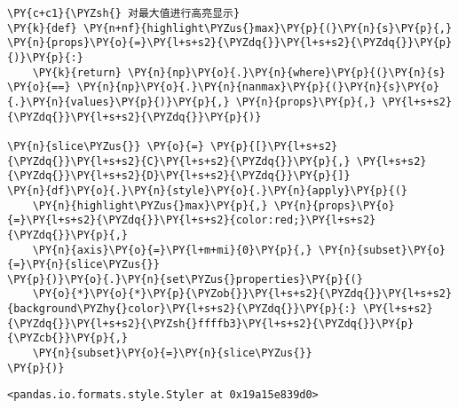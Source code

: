     \begin{tcolorbox}[breakable, size=fbox, boxrule=1pt, pad at break*=1mm,colback=cellbackground, colframe=cellborder]
\begin{Verbatim}[commandchars=\\\{\}]
\PY{c+c1}{\PYZsh{} 对最大值进行高亮显示}
\PY{k}{def} \PY{n+nf}{highlight\PYZus{}max}\PY{p}{(}\PY{n}{s}\PY{p}{,} \PY{n}{props}\PY{o}{=}\PY{l+s+s2}{\PYZdq{}}\PY{l+s+s2}{\PYZdq{}}\PY{p}{)}\PY{p}{:}
    \PY{k}{return} \PY{n}{np}\PY{o}{.}\PY{n}{where}\PY{p}{(}\PY{n}{s} \PY{o}{==} \PY{n}{np}\PY{o}{.}\PY{n}{nanmax}\PY{p}{(}\PY{n}{s}\PY{o}{.}\PY{n}{values}\PY{p}{)}\PY{p}{,} \PY{n}{props}\PY{p}{,} \PY{l+s+s2}{\PYZdq{}}\PY{l+s+s2}{\PYZdq{}}\PY{p}{)}

\PY{n}{slice\PYZus{}} \PY{o}{=} \PY{p}{[}\PY{l+s+s2}{\PYZdq{}}\PY{l+s+s2}{C}\PY{l+s+s2}{\PYZdq{}}\PY{p}{,} \PY{l+s+s2}{\PYZdq{}}\PY{l+s+s2}{D}\PY{l+s+s2}{\PYZdq{}}\PY{p}{]}
\PY{n}{df}\PY{o}{.}\PY{n}{style}\PY{o}{.}\PY{n}{apply}\PY{p}{(}
    \PY{n}{highlight\PYZus{}max}\PY{p}{,} \PY{n}{props}\PY{o}{=}\PY{l+s+s2}{\PYZdq{}}\PY{l+s+s2}{color:red;}\PY{l+s+s2}{\PYZdq{}}\PY{p}{,} 
    \PY{n}{axis}\PY{o}{=}\PY{l+m+mi}{0}\PY{p}{,} \PY{n}{subset}\PY{o}{=}\PY{n}{slice\PYZus{}}
\PY{p}{)}\PY{o}{.}\PY{n}{set\PYZus{}properties}\PY{p}{(}
    \PY{o}{*}\PY{o}{*}\PY{p}{\PYZob{}}\PY{l+s+s2}{\PYZdq{}}\PY{l+s+s2}{background\PYZhy{}color}\PY{l+s+s2}{\PYZdq{}}\PY{p}{:} \PY{l+s+s2}{\PYZdq{}}\PY{l+s+s2}{\PYZsh{}ffffb3}\PY{l+s+s2}{\PYZdq{}}\PY{p}{\PYZcb{}}\PY{p}{,} 
    \PY{n}{subset}\PY{o}{=}\PY{n}{slice\PYZus{}}
\PY{p}{)}
\end{Verbatim}
\end{tcolorbox}

            \begin{tcolorbox}[breakable, size=fbox, boxrule=.5pt, pad at break*=1mm, opacityfill=0]
\begin{Verbatim}[commandchars=\\\{\}]
<pandas.io.formats.style.Styler at 0x19a15e839d0>
\end{Verbatim}
\end{tcolorbox}
